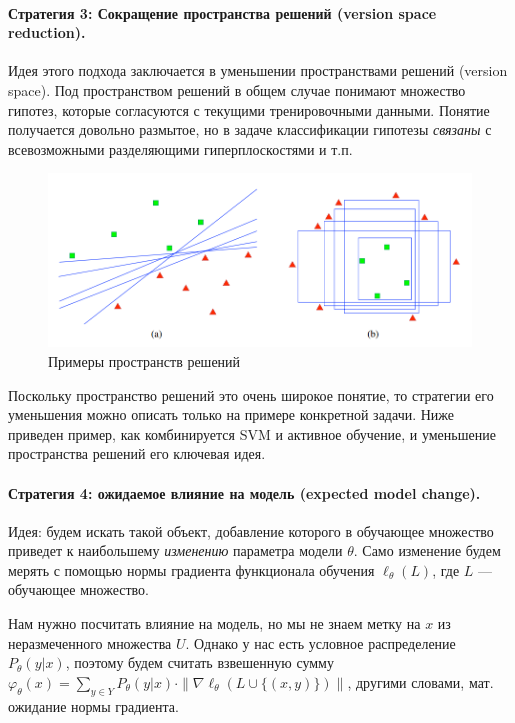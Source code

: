 \documentclass[specialist, 12pt, href]{article}
\begin{document}
\paragraph{Стратегия 3: Сокращение пространства решений (version space
reduction).}

Идея этого подхода заключается в уменьшении пространствами решений
(version space). Под пространством решений в общем случае понимают
множество гипотез, которые согласуются с текущими тренировочными
данными. Понятие получается довольно размытое, но в задаче классификации
гипотезы \emph{связаны} с всевозможными разделяющими гиперплоскостями и
т.п.

\begin{figure}[htbp]
\centering
\includegraphics[width=6in]{img/vs.png}
\caption{Примеры пространств решений}
\end{figure}

Поскольку пространство решений это очень широкое понятие, то стратегии
его уменьшения можно описать только на примере конкретной задачи. Ниже
приведен пример, как комбинируется SVM и активное обучение, и уменьшение
пространства решений его ключевая идея.

\paragraph{Стратегия 4: ожидаемое влияние на модель (expected model
change).}

Идея: будем искать такой объект, добавление которого в обучающее
множество приведет к наибольшему \emph{изменению} параметра модели
\(\theta\). Само изменение будем мерять с помощью нормы градиента
функционала обучения \(\ell_{\theta}(L)\), где \(L\) --- обучающее
множество.

Нам нужно посчитать влияние на модель, но мы не знаем метку на \(x\) из
неразмеченного множества \(U\). Однако у нас есть условное
распределение \(P_{\theta}(y|x)\), поэтому будем считать взвешенную
сумму
\(\varphi_{\theta}(x) = \sum_{y \in Y} P_{\theta}(y|x) \cdot \| \nabla\ell_{\theta}(L \cup \{(x, y)\})\|\),
другими словами, мат. ожидание нормы градиента.
\end{document}
